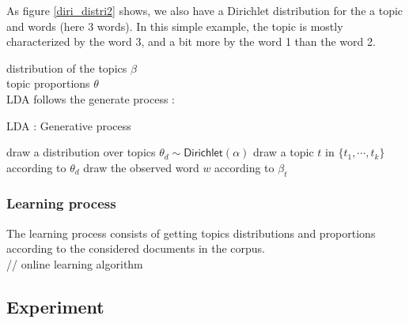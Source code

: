 \documentclass[a4paper,12pt]{report}
\begin{document}
As figure \ref{diri_distri2} shows, we also have a Dirichlet distribution for the a topic and words (here 3 words). In this simple example, the topic is mostly characterized by the word 3, and a bit more by the word 1 than the word 2.

distribution of the topics $\beta$\\
topic proportions $\theta$\\

LDA follows the generate process : 
\begin{algorithm}
\caption{LDA : Generative process}
\label{algo:hashtagsGraph}
\begin{algorithmic} 
\STATE draw a distribution over topics $\theta_d \sim \textsf{Dirichlet}(\alpha)$
\STATE draw a topic $t$ in $\{t_1,\cdots,t_k\}$ according to $\theta_d$
\STATE draw the observed word $w$ according to $\beta_t$
\ENDFOR
\ENDFOR
\\[10pt]
\end{algorithmic}
\end{algorithm}

\subsubsection{Learning process}
The learning process consists of getting topics distributions and proportions according to the considered documents in the corpus.\\

// online learning algorithm 


\newpage

\subsection{Experiment}
\end{document}
